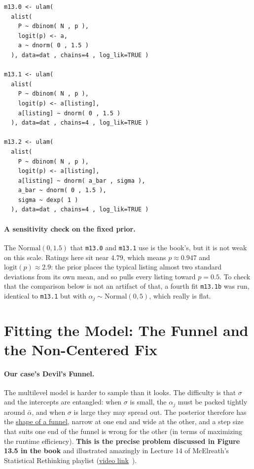 \documentclass[11pt,a4paper]{article}
\begin{document}
\begin{lstlisting}
m13.0 <- ulam(
  alist(
    P ~ dbinom( N , p ),
    logit(p) <- a,
    a ~ dnorm( 0 , 1.5 )
  ), data=dat , chains=4 , log_lik=TRUE )

m13.1 <- ulam(
  alist(
    P ~ dbinom( N , p ),
    logit(p) <- a[listing],
    a[listing] ~ dnorm( 0 , 1.5 )
  ), data=dat , chains=4 , log_lik=TRUE )

m13.2 <- ulam(
  alist(
    P ~ dbinom( N , p ),
    logit(p) <- a[listing],
    a[listing] ~ dnorm( a_bar , sigma ),
    a_bar ~ dnorm( 0 , 1.5 ),
    sigma ~ dexp( 1 )
  ), data=dat , chains=4 , log_lik=TRUE )
\end{lstlisting}

\paragraph{A sensitivity check on the fixed prior.} The $\text{Normal}(0,1.5)$
that \texttt{m13.0} and \texttt{m13.1} use is the book's, but it is not weak on
this scale. Ratings here sit near $4.79$, which means $p \approx 0.947$ and
$\text{logit}(p) \approx 2.9$: the prior places the typical listing almost two
standard deviations from its own mean, and so pulls every listing toward
$p = 0.5$. To check that the comparison below is not an artifact of that, a
fourth fit \texttt{m13.1b} was run, identical to \texttt{m13.1} but with
$\alpha_j \sim \text{Normal}(0,5)$, which really is flat.

\section{Fitting the Model: The Funnel and the Non-Centered Fix}

\paragraph{Our case's Devil's Funnel.} The multilevel model is harder to sample than it looks. The difficulty is that
$\sigma$ and the intercepts are entangled: when $\sigma$ is small, the
$\alpha_j$ must be packed tightly around $\bar\alpha$, and when $\sigma$ is
large they may spread out. The posterior therefore has the \underline{shape of a funnel},
narrow at one end and wide at the other, and a step size that suits one end of
the funnel is wrong for the other (in terms of maximizing the runtime efficiency). \textbf{This is the precise problem discussed in Figure 13.5 in the book} and illustrated amazingly in Lecture 14 of McElreath's Statistical Rethinking playlist (\href{https://www.youtube.com/watch?v=n2aJYtuGu54\&list=PLDcUM9US4XdMROZ57-OIRtIK0aOynbgZN\&index=14}{video link}~\cite{mcelreath2023_lecture14}).
\end{document}
